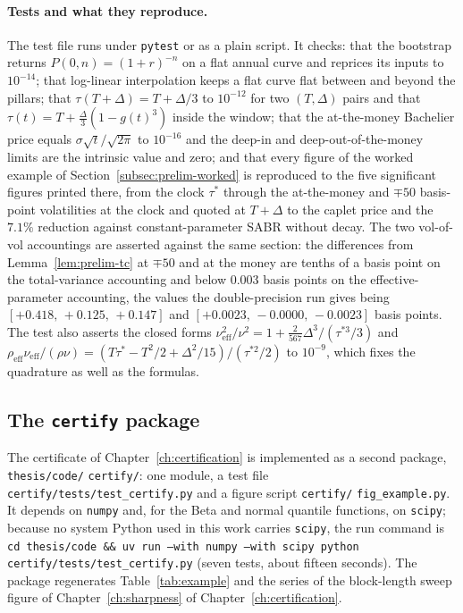 \paragraph{Tests and what they reproduce.}
The test file runs under \texttt{pytest} or as a plain script. It checks: that the bootstrap returns $P(0,n)=(1+r)^{-n}$ on a flat annual curve and reprices its inputs to $10^{-14}$; that log-linear interpolation keeps a flat curve flat between and beyond the pillars; that $\tau(T+\Delta)=T+\Delta/3$ to $10^{-12}$ for two $(T,\Delta)$ pairs and that $\tau(t)=T+\tfrac\Delta3(1-g(t)^3)$ inside the window; that the at-the-money Bachelier price equals $\sigma\sqrt t/\sqrt{2\pi}$ to $10^{-16}$ and the deep-in and deep-out-of-the-money limits are the intrinsic value and zero; and that every figure of the worked example of Section~\ref{subsec:prelim-worked} is reproduced to the five significant figures printed there, from the clock $\tau^*$ through the at-the-money and $\mp50$ basis-point volatilities at the clock and quoted at $T+\Delta$ to the caplet price and the $7.1\%$ reduction against constant-parameter SABR without decay. The two vol-of-vol accountings are asserted against the same section: the differences from Lemma~\ref{lem:prelim-tc} at $\mp50$ and at the money are tenths of a basis point on the total-variance accounting and below $0.003$ basis points on the effective-parameter accounting, the values the double-precision run gives being $[+0.418,\,+0.125,\,+0.147]$ and $[+0.0023,\,-0.0000,\,-0.0023]$ basis points. The test also asserts the closed forms $\nu_{\mathrm{eff}}^2/\nu^2=1+\tfrac{2}{567}\Delta^3/(\tau^{*3}/3)$ and $\rho_{\mathrm{eff}}\nu_{\mathrm{eff}}/(\rho\nu)=(T\tau^*-T^2/2+\Delta^2/15)/(\tau^{*2}/2)$ to $10^{-9}$, which fixes the quadrature as well as the formulas.


\subsection{The \texttt{certify} package}\label{subsec:appC-certify}

The certificate of Chapter~\ref{ch:certification} is implemented as a second package, \texttt{thesis/code/} \texttt{certify/}: one module, a test file \texttt{certify/tests/test\_certify.py} and a figure script \texttt{certify/} \texttt{fig\_example.py}. It depends on \texttt{numpy} and, for the Beta and normal quantile functions, on \texttt{scipy}; because no system Python used in this work carries \texttt{scipy}, the run command is \texttt{cd thesis/code \&\& uv run --with numpy --with scipy python certify/tests/test\_certify.py} (seven tests, about fifteen seconds). The package regenerates Table~\ref{tab:example} and the series of the block-length sweep figure of Chapter~\ref{ch:sharpness} of Chapter~\ref{ch:certification}.

